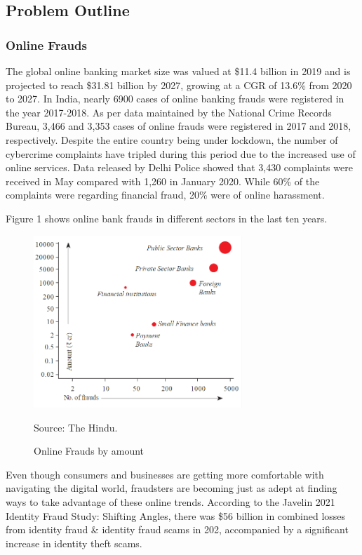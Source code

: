 \documentclass[12pt, oneside, a4paper]{article}
\begin{document}
\pagebreak
\subsection{Problem Outline}
\vspace{0.5cm}
\subsubsection{Online Frauds}
The global online banking market size was valued at \$11.4 billion in 2019 and is projected to reach \$31.81 billion by 2027, growing at a CGR of 13.6\% from 2020 to 2027. In India, nearly 6900 cases of online banking frauds were registered in the year 2017-2018. As per data maintained by the National Crime Records Bureau, 3,466 and 3,353 cases of online frauds were registered in 2017 and 2018, respectively. Despite the entire country being under lockdown, the number of cybercrime complaints have tripled during this period due to the increased use of online services. Data released by Delhi Police showed that 3,430 complaints were received in May compared with 1,260 in January 2020. While 60\% of the complaints were regarding financial fraud, 20\% were of online harassment.

Figure 1 shows online bank frauds in different sectors in the last ten years.

\begin{figure}[H]
\begin{center}
\includegraphics[width=0.7\textwidth]{Figure1.png}\\
\caption{Online Frauds by amount}{Source: The Hindu.}
\label{fig:Figure 1}
\end{center}
\end{figure}

Even though consumers and businesses are getting more comfortable with navigating the digital world, fraudsters are becoming just as adept at finding ways to take advantage of these online trends. According to the Javelin 2021 Identity Fraud Study: Shifting Angles, there was \$56 billion in combined losses from identity fraud & identity fraud scams in 202, accompanied by a significant increase in identity theft scams.
\end{document}
